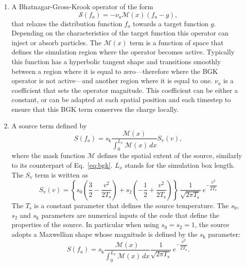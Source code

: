 \documentclass[11pt]{article}
\begin{document}
\begin{enumerate}
  \item A Bhatnagar-Gross-Krook operator \cite{Bhatnagar1954} of the form
    \begin{equation}\label{eq:bgk}
    \mathcal{S}(f_a) = - \nu_{a}\mathcal{M}(x)  \left( f_a - g \right),
  \end{equation}
that relaxes the distribution function $f_a$ towards a target function $g$. Depending on the characteristics of the target function this operator can inject or absorb particles. The $\mathcal{M}(x)$ term is a function of space that defines the simulation region where the operator becomes active. Typically this function has a hyperbolic tangent shape and transitions smoothly between a region where it is equal to zero---therefore where the BGK operator is not active---and another region where it is equal to one. $\nu_{a}$ is a coefficient that sets the operator magnitude. This coefficient can be either a constant, or can be adapted at each spatial position and each timestep to ensure that this BGK term conserves the charge locally.
%
\item A source term \cite[Appendix A]{Sarazin2011} defined by
%
\begin{equation}\label{eq:general_form}
   S(f_a) = s_\mathrm{k} \dfrac{\mathcal{M}(x)}{\int_{0}^{L_x} \mathcal{M}(x) \, dx} S_\mathrm{v}(v),
\end{equation}
%
where the mask function $\mathcal{M}$ defines the spatial extent of the source, similarly to its counterpart of Eq.~\ref{eq:bgk}. $L_x$ stands for the simulation box length. The  $S_\mathrm{v}$ term is written as
%
\begin{equation}\label{eq:sv_expression}
  S_\mathrm{v}(v) = \left\{ s_0\left( \dfrac{3}{2} - \dfrac{v^2}{2 T_\mathrm{s}} \right) + s_2 \left( -\dfrac{1}{2} + \dfrac{v^2}{2 T_\mathrm{s}} \right)  \right\} \, \dfrac{1}{\sqrt{2 \pi  T_\mathrm{s}} } \, e^{- \dfrac{v^2}{2 T_\mathrm{s}}}
\end{equation}
%
 The $T_\mathrm{s}$ is a constant parameter that defines the source temperature. The  $s_0$, $s_2$ and $s_\mathrm{k}$ parameters are numerical inputs of the code that define the properties of the source. In particular when using $s_0 = s_2 = 1$, the source adopts a Maxwellian shape whose magnitude is defined by the $s_\mathrm{k}$ parameter:
%
%
\begin{equation}
  S(f_a) = s_\mathrm{k} \dfrac{\mathcal{M}(x)}{\int_{0}^{L_x} \mathcal{M}(x) \, dx}\dfrac{1}{\sqrt{2\pi T_\mathrm{s}}} \, e^{- \dfrac{v^2}{2 T_\mathrm{s}}}.
\end{equation}
%
\end{enumerate}
%
\end{document}
